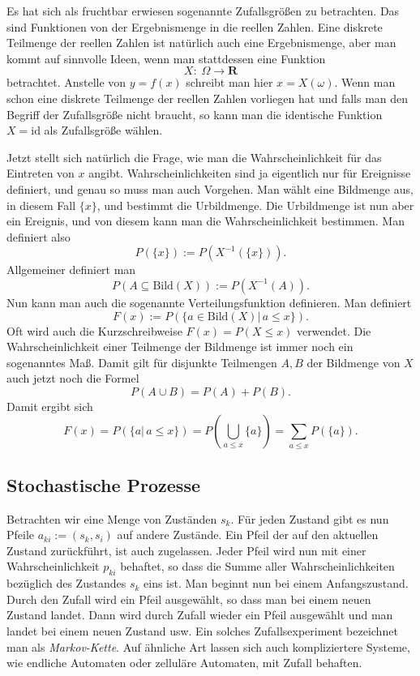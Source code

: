 \documentclass[a4paper,10pt,fleqn,twocolumn,twoside]{article}
\begin{document}
Es hat sich als fruchtbar erwiesen sogenannte Zufallsgrößen zu
betrachten. Das sind Funktionen von der Ergebnismenge in die reellen
Zahlen. Eine diskrete Teilmenge der reellen Zahlen ist natürlich auch
eine Ergebnismenge, aber man kommt auf sinnvolle Ideen, wenn man
stattdessen eine Funktion
\[X{:}\;\Omega\rightarrow\mathbf R\]
betrachtet. Anstelle von $y=f(x)$ schreibt man hier $x=X(\omega)$.
Wenn man schon eine diskrete Teilmenge der reellen Zahlen vorliegen
hat und falls man den Begriff der Zufallsgröße nicht braucht, so kann
man die identische Funktion $X=\mathrm{id}$ als Zufallsgröße wählen.

Jetzt stellt sich natürlich die Frage, wie man die
Wahrscheinlichkeit für das Eintreten von $x$ angibt.
Wahrscheinlichkeiten sind ja eigentlich nur für Ereignisse definiert,
und genau so muss man auch Vorgehen. Man wählt eine Bildmenge aus,
in diesem Fall $\{x\}$, und bestimmt die Urbildmenge.
Die Urbildmenge ist nun aber ein Ereignis, und von diesem kann man
die Wahrscheinlichkeit bestimmen. Man definiert also
\[P(\{x\}) := P(X^{-1}(\{x\})).\]
Allgemeiner definiert man
\[P(A\subseteq \mathrm{Bild}(X)) := P(X^{-1}(A)).\]
Nun kann man auch die sogenannte Verteilungsfunktion definieren.
Man definiert
\[F(x) := P(\{a{\in}\mathrm{Bild}(X)|\,a\le x\}).\]
Oft wird auch die Kurzschreibweise $F(x)=P(X\le x)$ verwendet.
Die Wahrscheinlichkeit einer Teilmenge der Bildmenge ist immer noch
ein sogenanntes Maß. Damit gilt für disjunkte Teilmengen $A,B$
der Bildmenge von $X$ auch jetzt noch die Formel
\[P(A\cup B) = P(A)+P(B).\]
Damit ergibt sich
\[F(x) = P(\{a|\,a\le x\})
= P(\bigcup_{a\le x}\{a\}) = \sum_{a\le x} P(\{a\}).\]


\subsection{Stochastische Prozesse}
Betrachten wir eine Menge von Zuständen $s_k$. Für jeden
Zustand gibt es nun Pfeile $a_{ki}:=(s_k,s_i)$ auf andere Zustände.
Ein Pfeil der auf den aktuellen Zustand zurückführt, ist auch
zugelassen. Jeder Pfeil wird nun mit einer Wahrscheinlichkeit
$p_{ki}$ behaftet, so dass die Summe aller Wahrscheinlichkeiten
bezüglich des Zustandes $s_k$ eins ist. Man beginnt nun bei einem
Anfangszustand. Durch den Zufall wird ein Pfeil ausgewählt, so dass
man bei einem neuen Zustand landet. Dann wird durch Zufall wieder
ein Pfeil ausgewählt und man landet bei einem neuen Zustand usw.
Ein solches Zufallsexperiment bezeichnet man als
\textit{Markov-Kette}. Auf ähnliche Art lassen sich auch
kompliziertere Systeme, wie endliche Automaten oder zelluläre
Automaten, mit Zufall behaften.
\end{document}
